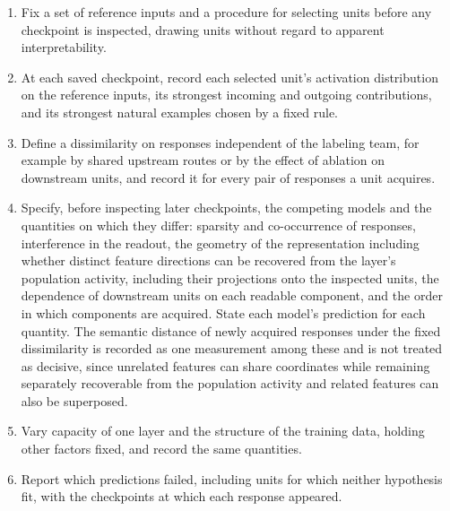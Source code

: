 \documentclass[11pt]{article}
\begin{document}
\begin{enumerate}
\item Fix a set of reference inputs and a procedure for selecting units before any checkpoint is inspected, drawing units without regard to apparent interpretability.
\item At each saved checkpoint, record each selected unit's activation distribution on the reference inputs, its strongest incoming and outgoing contributions, and its strongest natural examples chosen by a fixed rule.
\item Define a dissimilarity on responses independent of the labeling team, for example by shared upstream routes or by the effect of ablation on downstream units, and record it for every pair of responses a unit acquires.
\item Specify, before inspecting later checkpoints, the competing models and the quantities on which they differ: sparsity and co-occurrence of responses, interference in the readout, the geometry of the representation including whether distinct feature directions can be recovered from the layer's population activity, including their projections onto the inspected units, the dependence of downstream units on each readable component, and the order in which components are acquired. State each model's prediction for each quantity. The semantic distance of newly acquired responses under the fixed dissimilarity is recorded as one measurement among these and is not treated as decisive, since unrelated features can share coordinates while remaining separately recoverable from the population activity and related features can also be superposed.
\item Vary capacity of one layer and the structure of the training data, holding other factors fixed, and record the same quantities.
\item Report which predictions failed, including units for which neither hypothesis fit, with the checkpoints at which each response appeared.
\end{enumerate}
\end{document}
